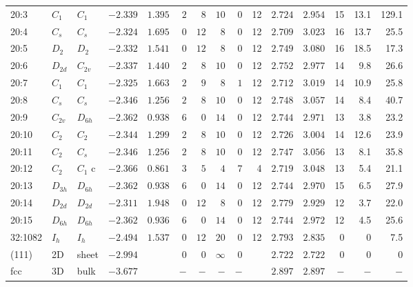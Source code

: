 \begin{table}[ht!]
{\begin{tabular}{lllrrrrrrrrrrrr}
20:3    & $C_1$    & $C_{1 }$ & $-2.339$ & $1.395$  & $2$ & $8$  & $10$     & $0$ & 12 & $2.724$ & $2.954$ & 15  & 13.1 &  129.1   \\
20:4    & $C_s$    & $C_{s }$ & $-2.324$ & $1.695$  & $0$ & $12$ & $8$      & $0$ & 12 & $2.709$ & $3.023$ & 16  & 13.7 &  25.5    \\
20:5    & $D_2$    & $D_{2 }$ & $-2.332$ & $1.541$  & $0$ & $12$ & $8$      & $0$ & 12 & $2.749$ & $3.080$ & 16  & 18.5 &  17.3    \\
20:6    & $D_{2d}$ & $C_{2v}$ & $-2.337$ & $1.440$  & $2$ & $8$  & $10$     & $0$ & 12 & $2.752$ & $2.977$ & 14  & 9.8  &  26.6    \\
20:7    & $C_1$    & $C_{1 }$ & $-2.325$ & $1.663$  & $2$ & $9$  & $8$      & $1$ & 12 & $2.712$ & $3.019$ & 14  & 10.9 &  25.8    \\
20:8    & $C_s$    & $C_{s }$ & $-2.346$ & $1.256$  & $2$ & $8$  & $10$     & $0$ & 12 & $2.748$ & $3.057$ & 14  & 8.4  &  40.7    \\
20:9    & $C_{2v}$ & $D_{6h}$ & $-2.362$ & $0.938$  & $6$ & $0$  & $14$     & $0$ & 12 & $2.744$ & $2.971$ & 13  & 3.8  &  23.2    \\
20:10   & $C_2$    & $C_{2 }$ & $-2.344$ & $1.299$  & $2$ & $8$  & $10$     & $0$ & 12 & $2.726$ & $3.004$ & 14  & 12.6 &  23.9    \\
20:11   & $C_2$    & $C_{s }$ & $-2.346$ & $1.256$  & $2$ & $8$  & $10$     & $0$ & 12 & $2.747$ & $3.056$ & 13  & 8.1  &  35.8    \\
20:12   & $C_2$    & $C_1$ c  & $-2.366$ & $0.861$  & $3$ & $5$  & $4$      & $7$ & 4  & $2.719$ & $3.048$ & 13  & 5.4  &  21.1    \\
20:13   & $D_{3h}$ & $D_{6h}$ & $-2.362$ & $0.938$  & $6$ & $0$  & $14$     & $0$ & 12 & $2.744$ & $2.970$ & 15  & 6.5  &  27.9    \\
20:14   & $D_{2d}$ & $D_{2d}$ & $-2.311$ & $1.948$  & $0$ & $12$ & $8$      & $0$ & 12 & $2.779$ & $2.929$ & 12  & 3.7  &  22.0    \\
20:15   & $D_{6h}$ & $D_{6h}$ & $-2.362$ & $0.936$  & $6$ & $0$  & $14$     & $0$ & 12 & $2.744$ & $2.972$ & 12  & 4.5  &  25.6    \\
32:1082 & $I_h$    & $I_h$    & $-2.494$ & $1.537$  & $0$ & $12$ & $20$     & $0$ & 12 & $2.793$ & $2.835$ & 0   & 0    &  7.5   \\
(111)   & 2D       & sheet    & $-2.994$ &          & $0$ & $0$  & $\infty$ & $0$ &    & $2.722$ & $2.722$ & 0   & 0    & 0   \\
fcc     & 3D       & bulk     & $-3.677$ &          & $-$ & $-$  & $-$      & $-$ &    & $2.897$ & $2.897$ & $-$ & $-$  & $-$ \\
		\bottomrule
    \end{tabular}}
\end{table}


